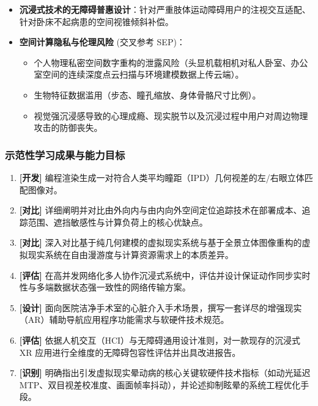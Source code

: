 \begin{itemize}
\begin{itemize}
        \item 物理环境遮蔽安全隐患：沉浸式 VR 完全阻断现实视觉，导致室内跌倒摔伤、撞击实体家具与墙壁风险。
    \end{itemize}
    \item \textbf{沉浸式技术的无障碍普惠设计}：针对严重肢体运动障碍用户的注视交互适配、针对卧床不起病患的空间视锥倾斜补偿。
    \item \textbf{空间计算隐私与伦理风险} (交叉参考 SEP)：
    \begin{itemize}
        \item 个人物理私密空间数字重构的泄露风险（头显机载相机对私人卧室、办公室空间的连续深度点云扫描与环境建模数据上传云端）。
        \item 生物特征数据滥用（步态、瞳孔缩放、身体骨骼尺寸比例）。
        \item 视觉强沉浸感导致的心理成瘾、现实脱节以及沉浸过程中用户对周边物理攻击的防御丧失。
    \end{itemize}
\end{itemize}

\subsubsection{示范性学习成果与能力目标}
\begin{enumerate}
    \item \textbf{[开发]} 编程渲染生成一对符合人类平均瞳距（IPD）几何视差的左/右眼立体匹配图像对。
    \item \textbf{[对比]} 详细阐明并对比由外向内与由内向外空间定位追踪技术在部署成本、追踪范围、遮挡敏感性与计算负荷上的核心优缺点。
    \item \textbf{[对比]} 深入对比基于纯几何建模的虚拟现实系统与基于全景立体图像重构的虚拟现实系统在自由漫游度与计算资源需求上的本质差异。
    \item \textbf{[评估]} 在高并发网络化多人协作沉浸式系统中，评估并设计保证动作同步实时性与多端数据状态强一致性的网络传输方案。
    \item \textbf{[设计]} 面向医院洁净手术室的心脏介入手术场景，撰写一套详尽的增强现实（AR）辅助导航应用程序功能需求与软硬件技术规范。
    \item \textbf{[评估]} 依据人机交互（HCI）与无障碍通用设计准则，对一款现存的沉浸式 XR 应用进行全维度的无障碍包容性评估并出具改进报告。
    \item \textbf{[识别]} 明确指出引发虚拟现实晕动病的核心关键软硬件技术指标（如动光延迟 MTP、双目视差校准度、画面帧率抖动），并论述抑制眩晕的系统工程优化手段。
\end{enumerate}

